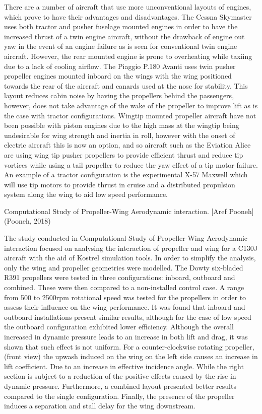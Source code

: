 \documentclass[../../main.tex]{subfiles}
\begin{document}
There are a number of aircraft that use more unconventional layouts of engines, which prove to have their advantages and disadvantages.
The Cessna Skymaster uses both tractor and pusher fuselage mounted engines in order to have the increased thrust of a twin engine aircraft, without the drawback of engine out yaw in the event of an engine failure as is seen for conventional twin engine aircraft.
However, the rear mounted engine is prone to overheating while taxiing due to a lack of cooling airflow.
The Piaggio P.180 Avanti uses twin pusher propeller engines mounted inboard on the wings with the wing positioned towards the rear of the aircraft and canards used at the nose for stability.
This layout reduces cabin noise by having the propellers behind the passengers, however, does not take advantage of the wake of the propeller to improve lift as is the case with tractor configurations.
Wingtip mounted propeller aircraft have not been possible with piston engines due to the high mass at the wingtip being undesirable for wing strength and inertia in roll, however with the onset of electric aircraft this is now an option, and so aircraft such as the Eviation Alice are using wing tip pusher propellers to provide efficient thrust and reduce tip vortices while using a tail propeller to reduce the yaw effect of a tip motor failure.
An example of a tractor configuration is the experimental X-57 Maxwell which will use tip motors to provide thrust in cruise and a distributed propulsion system along the wing to aid low speed performance. 

Computational Study of Propeller-Wing Aerodynamic interaction. [Aref Pooneh] (Pooneh, 2018) 

The study conducted in Computational Study of Propeller-Wing Aerodynamic interaction focused on analysing the interaction of propeller and wing for a C130J aircraft with the aid of Kostrel simulation tools.
In order to simplify the analysis, only the wing and propeller geometries were modelled.
The Dowty six-bladed R391 propellers were tested in three configurations: inboard, outboard and combined.
These were then compared to a non-installed control case.
A range from 500 to 2500rpm rotational speed was tested for the propellers in order to assess their influence on the wing performance.
It was found that inboard and outboard installations present similar results, although for the case of low speed the outboard configuration exhibited lower efficiency.
Although the overall increased in dynamic pressure leads to an increase in both lift and drag, it was shown that such effect is not uniform.
For a counter-clockwise rotating propeller, (front view) the upwash induced on the wing on the left side causes an increase in lift coefficient.
Due to an increase in effective incidence angle.
While the right section is subject to a reduction of the positive effects caused by the rise in dynamic pressure.
Furthermore, a combined layout presented better results compared to the single configuration.
Finally, the presence of the propeller induces a separation and stall delay for the wing downstream. 
\end{document}
